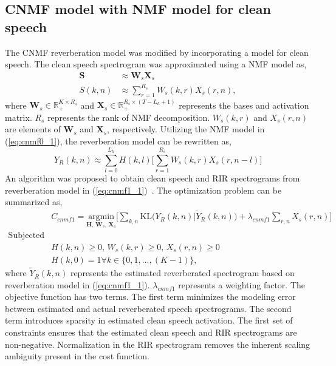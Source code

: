 \subsection{CNMF model with NMF model for clean speech}
The CNMF reverberation model was modified by incorporating a model for clean speech. The clean speech spectrogram was approximated using a NMF model as, 
\begin{align}
\mathbf{S}&\approx \mathbf{W}_s\mathbf{X}_s \nonumber \\
S(k,n)&\approx \sum\limits_{r=1}^{R_s} W_s(k,r)X_s(r,n),
\end{align}
where $\mathbf{W}_s\in\mathbb{R}_+^{K\times R_s}$ and $\mathbf{X}_s\in\mathbb{R}_+^{R_s\times (T-L_h+1)}$ represents the bases and activation matrix. $R_s$ represents the rank of NMF decomposition. $W_s(k,r)$ and $X_s(r,n)$ are elements of $\mathbf{W}_s$ and $\mathbf{X}_s$, respectively. Utilizing the NMF model in (\ref{eq:cnmf0_1}), the reverberation model can be rewritten as,
\begin{equation}
Y_R(k,n)\approx \sum\limits_{l=0}^{L_h} H(k,l)\bigg[\sum\limits_{r=1}^{R_s}W_s(k,r)X_s(r,n-l)\bigg]
\label{eq:cnmf1_1}
\end{equation}
An algorithm was proposed to obtain clean speech and RIR spectrograms from reverberation model in (\ref{eq:cnmf1_1})~\cite{mohammadiha2016speech, Mohammadiha2015}. The optimization problem can be summarized as,
\begin{align}
&C_{cnmf1} = \underset{\mathbf{H}\text{, }\mathbf{W}_s\text{, }\mathbf{X}_s}{\text{argmin}} \Bigg[ \sum_{k,n} \text{KL} \bigg(Y_R(k,n)|\tilde{Y}_R(k,n)\bigg)+\lambda_{cnmf1}\sum_{r,n}X_s(r,n) \Bigg] \nonumber \\ 
\text{Subjected to}& \nonumber \\
&H(k,n) \geq 0\text{, }W_s(k,r)\geq 0\text{, }X_s(r,n)\geq 0 \nonumber \\ 
&H(k,0) = 1\forall k\in \{0,1,...,(K-1)\} \text{,}
\label{eq:cost_cnmf1}
\end{align}
where $\tilde{Y}_R(k,n)$ represents the estimated reverberated spectrogram based on reverberation model in (\ref{eq:cnmf1_1}). $\lambda_{cnmf1}$ represents a weighting factor. The objective function has two terms. The first term minimizes the modeling error between estimated and actual reverberated speech spectrograms. The second term introduces sparsity in estimated clean speech activation. The first set of constraints ensures that the estimated clean speech and RIR spectrograms are non-negative. Normalization in the RIR spectrogram removes the inherent scaling ambiguity present in the cost function.

